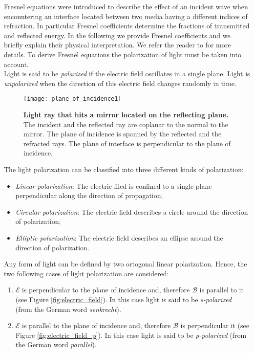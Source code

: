 \indent Fresnel equations were introduced to describe the effect of an incident wave when encountering an interface located between two media having a different indices of refraction. In particular Fresnel coefficients determine the fractions of transmitted and reflected energy.  
In the following we provide Fresnel coefficients and we briefly explain their physical interpretation. 
We refer the reader to \cite{born2013principles, hecht1998hecht, feynman2011feynman} for more details. To derive Fresnel equations the polarization of light must be taken into account.
\\ \indent Light is said to be \textit{polarized} if the electric field oscillates in a single plane. Light is \textit{unpolarized} when the direction of this electric field changes randomly in time.
\begin{figure}[t]
 \label{fig:planeofincidence}
     \begin{center}
     \texttt{[image: plane\_of\_incidence1]}
     \end{center}
     \caption{\textbf{Light ray that hits a mirror located on the reflecting plane.} The incident and the reflected ray are coplanar to the normal to the mirror. The plane of incidence is spanned by the reflected and the refracted rays. The plane of interface is perpendicular to the plane of incidence.}
\label{fig:planeofincidence}
 \end{figure}
The light polarization can be classified into three different kinds of polarization:
\begin{itemize}
\item \textit{Linear polarization}: The electric filed is confined to a single plane perpendicular along the direction of propagation;
\item \textit{Circular polarization}: The electric field describes a circle around the direction of polarization;
\item \textit{Elliptic polarization}: The electric field describes an ellipse around the direction of polarization.
\end{itemize}
Any form of light can be defined by two ortogonal linear polarization.
Hence, the two following cases of light polarization are considered: 
\begin{enumerate}
\item $\boldsymbol{\mathcal{E}}$ is perpendicular to the plane of incidence and, therefore $\boldsymbol{\mathcal{B}}$ is parallel to it (see Figure \ref{fig:electric_field}). In this case light is said to be \textit{s-polarized} (from the German word \textit{senkrecht}).
\item $\boldsymbol{\mathcal{E}}$ is parallel to the plane of incidence and, therefore $\boldsymbol{\mathcal{B}}$ is perpendicular it (see Figure \ref{fig:electric_field_p}). In this case light is said to be \textit{p-polarized} (from the German word \textit{parallel}).
\end{enumerate}
